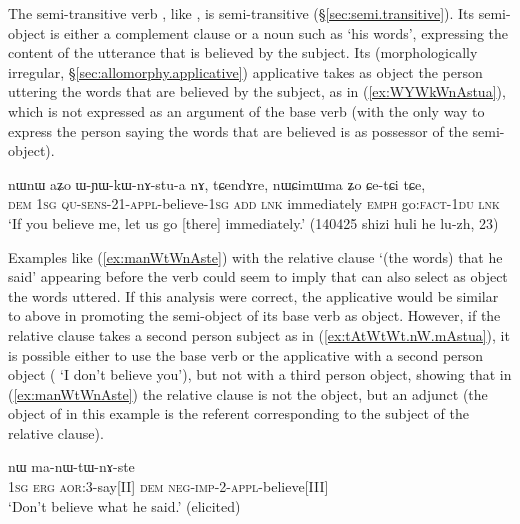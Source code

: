 The semi-transitive verb , like , is semi-transitive (§\ref{sec:semi.transitive}). Its semi-object is either a complement clause or a noun such as  `his words', expressing the content of the utterance that is believed by the subject. Its (morphologically irregular, §\ref{sec:allomorphy.applicative}) applicative  takes as object the person uttering the words that are believed by the subject, as in (\ref{ex:WYWkWnAstua}), which is not expressed as an argument of the base verb (with  the only way to express the person saying the words that are believed is as possessor of the semi-object).

\begin{exe}
\ex \label{ex:WYWkWnAstua}
\gll nɯnɯ aʑo ɯ-ɲɯ-kɯ-nɤ-stu-a nɤ, tɕendɤre, nɯɕimɯma ʑo ɕe-tɕi tɕe, \\
\textsc{dem} \textsc{1sg} \textsc{qu}-\textsc{sens}-2\fl{}1-\textsc{appl}-believe-\textsc{1sg} \textsc{add} \textsc{lnk} immediately \textsc{emph} go:\textsc{fact}-\textsc{1du} \textsc{lnk} \\
\glt `If you believe me, let us go [there] immediately.' (140425 shizi huli he lu-zh, 23)
\end{exe}

Examples like (\ref{ex:manWtWnAste}) with the relative clause  `(the words) that he said' appearing before the verb could seem to imply that  can also select as object the words uttered. If this analysis were correct, the applicative  would be similar to  above in promoting the semi-object of its base verb as object. However, if the relative clause takes a second person subject as in (\ref{ex:tAtWtWt.nW.mAstua}), it is possible either to use the base verb  or the applicative  with a second person object ( `I don't believe you'), but not with a third person object, showing that in (\ref{ex:manWtWnAste}) the relative clause is not the object, but an adjunct (the object of  in this example is the referent corresponding to the subject of the relative clause).

\begin{exe}
\ex \label{ex:manWtWnAste}
 nɯ ma-nɯ-tɯ-nɤ-ste \\
\textsc{1sg} \textsc{erg} \textsc{aor}:3\flobv{}-say[II] \textsc{dem} \textsc{neg}-\textsc{imp}-2-\textsc{appl}-believe[III] \\
\glt `Don't believe what he said.' (elicited)
\end{exe}


